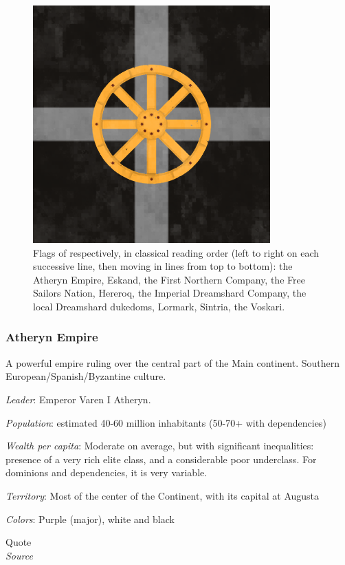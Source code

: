 \begin{figure}[!ht]
        \includegraphics[scale=0.25]{img/flag/voskari.png}

    \caption{Flags of respectively, in classical reading order (left to right on each successive line, then moving in lines from top to bottom): the Atheryn Empire, Eskand, the First Northern Company, the Free Sailors Nation, Hereroq, the Imperial Dreamshard Company, the local Dreamshard dukedoms, Lormark, Sintria, the Voskari.}
    \label{flags}
\end{figure}



\subsubsection{Atheryn Empire}


A powerful empire ruling over the central part of the Main continent. Southern European/Spanish/Byzantine culture. 


\textit{Leader}: Emperor Varen I Atheryn.

\textit{Population}: estimated 40-60 million inhabitants (50-70+ with dependencies)

\textit{Wealth per capita}: Moderate on average, but with significant inequalities: presence of a very rich elite class, and a considerable poor underclass. For dominions and dependencies, it is very variable.

\textit{Territory}: Most of the center of the Continent, with its capital at Augusta
    
\textit{Colors}: Purple (major), white and black


\begin{rpg-quotebox}
Quote \\ \textendash \textit{Source}
\end{rpg-quotebox}

